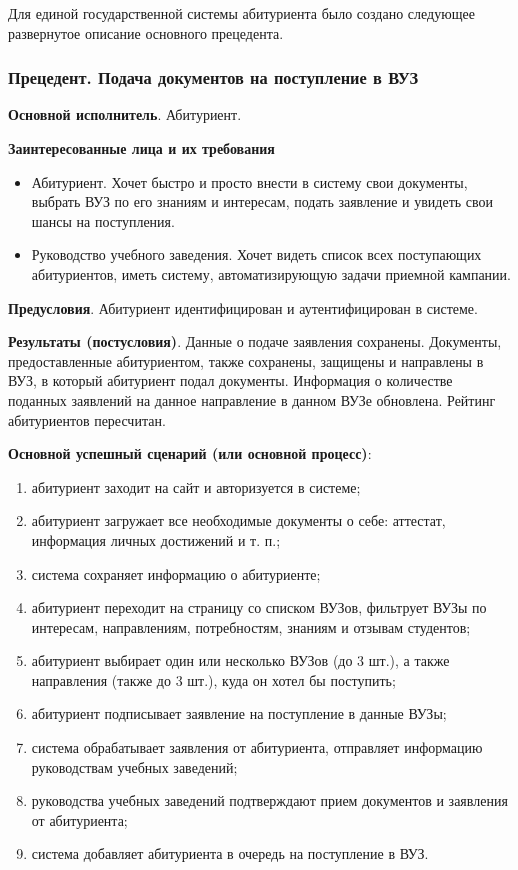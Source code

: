\documentclass[a4paper, 14pt]{extarticle}
\begin{document}
Для единой государственной системы абитуриента было создано следующее
развернутое описание основного прецедента.

\subsubsection*{Прецедент. Подача документов на поступление в ВУЗ}

{
  \setlength{\parindent}{0pt}

  \textbf{Основной исполнитель}. Абитуриент.

  \textbf{Заинтересованные лица и их требования}
  \begin{itemize}
    \item Абитуриент. Хочет быстро и просто внести в систему свои документы,
    выбрать ВУЗ по его знаниям и интересам, подать заявление и увидеть свои
    шансы на поступления.
    \item Руководство учебного заведения. Хочет видеть список всех поступающих
    абитуриентов, иметь систему, автоматизирующую задачи приемной кампании.
  \end{itemize}

  \textbf{Предусловия}. Абитуриент идентифицирован и аутентифицирован в системе.

  \textbf{Результаты (постусловия)}. Данные о подаче заявления сохранены.
  Документы, предоставленные абитуриентом, также сохранены, защищены и
  направлены в ВУЗ, в который абитуриент подал документы. Информация о
  количестве поданных заявлений на данное направление в данном ВУЗе обновлена.
  Рейтинг абитуриентов пересчитан.

  \textbf{Основной успешный сценарий (или основной процесс)}:
  \begin{enumerate}
    \item абитуриент заходит на сайт и авторизуется в системе;
    \item абитуриент загружает все необходимые документы о себе: аттестат,
    информация личных достижений и т. п.;
    \item система сохраняет информацию о абитуриенте;
    \item абитуриент переходит на страницу со списком ВУЗов, фильтрует
    ВУЗы по интересам, направлениям, потребностям, знаниям и отзывам студентов;
    \item абитуриент выбирает один или несколько ВУЗов (до 3 шт.), а также
    направления (также до 3 шт.), куда он хотел бы поступить;
    \item абитуриент подписывает заявление на поступление в данные ВУЗы;
    \item система обрабатывает заявления от абитуриента, отправляет информацию
    руководствам учебных заведений;
    \item руководства учебных заведений подтверждают прием документов и
    заявления от абитуриента;
    \item система добавляет абитуриента в очередь на поступление в ВУЗ.
  \end{enumerate}

}
\end{document}
